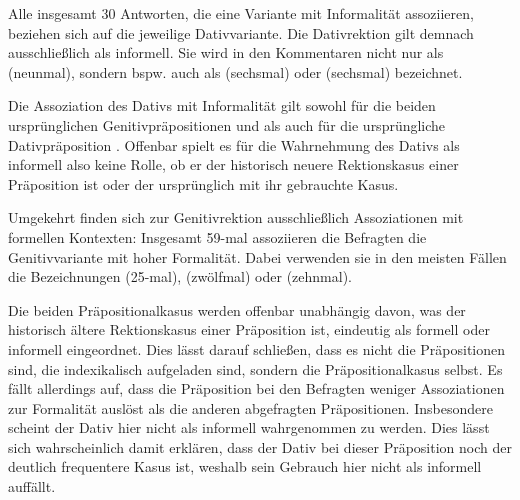 Alle insgesamt 30 Antworten, die eine Variante mit Informalität assoziieren, beziehen sich auf die jeweilige Dativvariante. 
Die Dativrektion gilt demnach ausschließlich als informell. 
Sie wird in den Kommentaren nicht nur als  (neunmal), sondern bspw. auch als  (sechsmal) oder  (sechsmal) bezeichnet. 

Die Assoziation des Dativs mit Informalität gilt sowohl für die beiden ursprünglichen Genitivpräpositionen \wegen{} und \waehrend{} als auch für die ursprüngliche Dativpräposition \dank{}. 
Offenbar spielt es für die Wahrnehmung des Dativs als informell also keine Rolle, ob er der historisch neuere Rektionskasus einer Präposition ist oder der ursprünglich mit ihr gebrauchte Kasus. 

Umgekehrt finden sich zur Genitivrektion ausschließlich Assoziationen mit formellen Kontexten:
Insgesamt 59-mal assoziieren die Befragten die Genitivvariante mit hoher Formalität. 
Dabei verwenden sie in den meisten Fällen die Bezeichnungen  (25-mal),  (zwölfmal) oder  (zehnmal). 

Die beiden Präpositionalkasus werden offenbar unabhängig davon, was der historisch ältere Rektionskasus einer Präposition ist, eindeutig als formell oder informell eingeordnet. 
Dies lässt darauf schließen, dass es nicht die Präpositionen sind, die indexikalisch aufgeladen sind, sondern  die Präpositionalkasus selbst. 
Es fällt allerdings auf, dass die Präposition \gegenueber{} bei den Befragten weniger Assoziationen zur Formalität auslöst als die anderen abgefragten Präpositionen. 
Insbesondere scheint der Dativ hier nicht als informell wahrgenommen zu werden. 
Dies lässt sich wahrscheinlich damit erklären, dass der Dativ bei dieser Präposition noch der deutlich frequentere Kasus ist, weshalb sein Gebrauch hier nicht als informell auffällt. 

